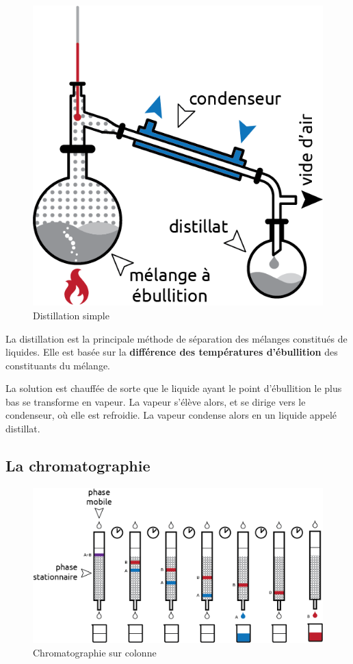 \documentclass[
  11pt,
  a4paper,
  openany]{book}
\begin{document}
\begin{figure}

{\centering \includegraphics[width=0.4\linewidth]{images/distillation} 

}

\caption{Distillation simple}\label{fig:distillation}
\end{figure}

La distillation est la principale méthode de séparation des mélanges constitués de liquides. Elle est basée sur la \textbf{différence des températures d'ébullition} des constituants du mélange.

La solution est chauffée de sorte que le liquide ayant le point d'ébullition le plus bas se transforme en vapeur. La vapeur s'élève alors, et se dirige vers le condenseur, où elle est refroidie. La vapeur condense alors en un liquide appelé distillat.

\subsection{La chromatographie}\label{la-chromatographie}

\begin{figure}

{\centering \includegraphics[width=0.67\linewidth]{images/chromatographie} 

}

\caption{Chromatographie sur colonne}\label{fig:chromatographie}
\end{figure}
\end{document}
